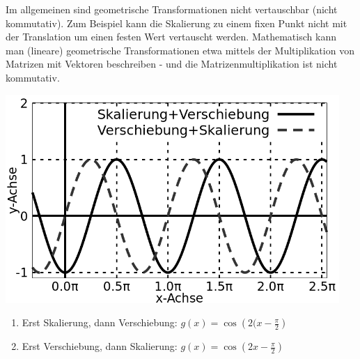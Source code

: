 \item Im allgemeinen sind geometrische Transformationen nicht vertauschbar (nicht kommutativ). Zum Beispiel kann die Skalierung zu einem fixen Punkt nicht mit der Translation um einen festen Wert vertauscht werden. Mathematisch kann man (lineare) geometrische Transformationen etwa mittels der Multiplikation von Matrizen mit Vektoren beschreiben - und die Matrizenmultiplikation ist nicht kommutativ.

\begin{center}
\includegraphics[width=0.95\textwidth]{../tex-snippets/ex-fn-transform-4-a.png}
\end{center}

\begin{enumerate}
\item Erst Skalierung, dann Verschiebung: $g(x) = \cos\left(2(x-\frac{\pi}{2}\right)$
\item Erst Verschiebung, dann Skalierung: $g(x) = \cos\left(2x-\frac{\pi}{2}\right)$
\end{enumerate}
